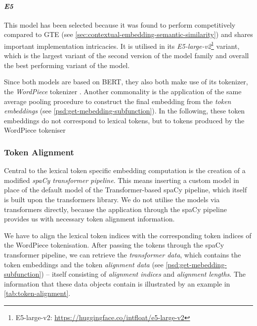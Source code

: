 \documentclass[11pt]{scrreprt}
\let\cite\parencite  %
\begin{document}
{\paragraph{\textit{E5}} This model has been selected because it was found to perform competitively compared to GTE (see \cref{sec:contextual-embedding-semantic-similarity}) and shares important implementation intricacies. It is utilised in its \textit{E5-large-v2}\footnote{E5-large-v2: \url{https://huggingface.co/intfloat/e5-large-v2}} variant, which is the largest variant of the second version of the model family and overall the best performing variant of the model.

\vspace{\baselineskip}
Since both models are based on BERT, they also both make use of its tokenizer, the \textit{WordPiece} tokenizer \cite{devlinBERTPretrainingDeep2019}. Another commonality is the application of the same average pooling procedure to construct the final embedding from the \textit{token embeddings} (see \cref{psd:get-mebedding-subfunction}). In the following, these token embeddings do not correspond to lexical tokens, but to tokens produced by the WordPiece tokeniser

\subsubsection{Token Alignment}
Central to the lexical token specific embedding computation is the creation of a modified \textit{spaCy transformer pipeline}. This means inserting a custom model in place of the default model of the Transformer-based spaCy pipeline, which itself is built upon the transformers library. We do not utilise the models via transformers directly, because the application through the spaCy pipeline provides us with necessary token alignment information.

 We have to align the lexical token indices with the corresponding token indices of the WordPiece tokenisation. After passing the tokens through the spaCy transformer pipeline, we can retrieve the \textit{transformer data}, which contains the token embeddings and the token \textit{alignment data} (see \cref{psd:get-mebedding-subfunction}) -- itself consisting of \textit{alignment indices} and \textit{alignment lengths}. The information that these data objects contain is illustrated by an example in \cref{tab:token-alignment}.

}
\end{document}
